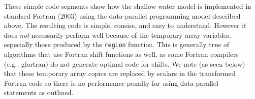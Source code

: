 These simple code segments show how the shallow water model is
implemented in standard Fortran (2003) using the data-parallel
programming model described above.  The resulting code is simple,
consise, and easy to understand.  However it does \emph{not}
necessarily perform well because of the temporary array variables,
especially those produced by the {\tt region} function.  This is
generally true of algorithms that use Fortran shift functions as well,
as some Fortran compilers (e.g., gfortran) do not generate optimal
code for shifts.  We note (as seen below) that these temporary array
copies are replaced by scalars in the transformed Fortran code so
there is no performance penalty for using data-parallel statements as
outlined.
